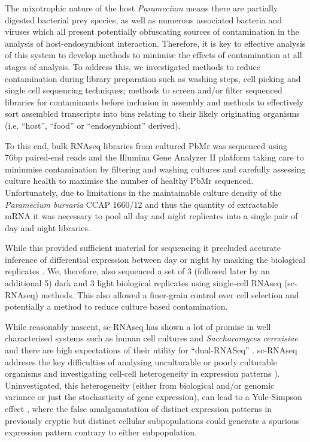 The mixotrophic nature of the host \textit{Paramecium} \citep{Dolan1992} means there 
are partially digested bacterial prey species, as well as numerous 
associated bacteria \citep{Gortz2009,Fokin2009,Schrallhammer2009} and viruses \citep{VanEtten1983} which
all present potentially obfuscating sources of contamination in the analysis of host-endosymbiont
interaction.  
Therefore, it is key to effective analysis of this system to develop methods
to minimise the effects of contamination at all stages of analysis.  To address this,
we investigated methods to reduce contamination during library preparation such as washing steps, cell picking
and single cell sequencing techniques; methods to screen and/or filter sequenced libraries
for contaminants before inclusion in assembly and methods to effectively sort
assembled transcripts into bins relating to their likely originating organisms
(i.e. ``host'', ``food'' or ``endosymbiont'' derived).



To this end, bulk RNAseq libraries from cultured PbMr was sequenced using 76bp paired-end reads and the Illumina Gene Analyzer II platform 
taking care to mininmise contamination by filtering and washing cultures and carefully
assessing culture health to maximise the number of healthy PbMr sequenced. 
Unfortunately, due to limitations in the maintainable culture density of the 
\textit{Paramecium bursaria} CCAP 1660/12 and thus the quantity of extractable
mRNA it was necessary to pool all day and night replicates into a single pair of day and night libraries. 

While this provided sufficient material for sequencing it precluded accurate inference of differential expression between day or night
by masking the biological replicates \citep{Auer2010}.
We, therefore, also sequenced a set of 3 (followed later by an additional 5) dark and 3 light
biological replicates using single-cell RNAseq (sc-RNAseq) methods.
This also allowed a finer-grain control over cell selection and potentially
a method to reduce culture based contamination.


While reasonably nascent, sc-RNAseq has shown a lot of promise in well characterised systems such as human cell cultures \citep{Bengtsson2005,Shalek2013}
and \textit{Saccharomyces cerevisiae} \citep{Lipson2009} and there are high expectations
of their utility for ``dual-RNASeq'' \citep{Westermann2012}.  sc-RNAseq addreses 
the key difficulties of analysing unculturable or poorly culturable organisms \citep{Murray2012} and investigating
cell-cell heterogeneity in expression patterns \citep{Raj2008,Shalek2013}).  
Uninvestigated, this heterogeneity (either from biological and/or genomic variance or just the stochasticity of gene expression),
can lead to a Yule-Simpson effect \citep{Yule1903a,Simpson1951}, where the false amalgamatation of distinct expression patterns
in previously cryptic but distinct cellular subpopulations could generate a spurious expression pattern contrary to either subpopulation.


